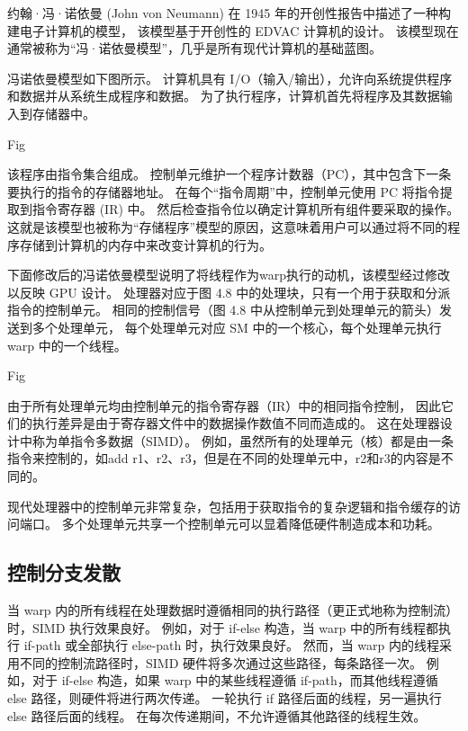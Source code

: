 \begin{remark}[warp与SIMD硬件]
约翰·冯·诺依曼 (John von Neumann) 在 1945 年的开创性报告中描述了一种构建电子计算机的模型，
该模型基于开创性的 EDVAC 计算机的设计。 该模型现在通常被称为“冯·诺依曼模型”，几乎是所有现代计算机的基础蓝图。

冯诺依曼模型如下图所示。 计算机具有 I/O（输入/输出），允许向系统提供程序和数据并从系统生成程序和数据。 
为了执行程序，计算机首先将程序及其数据输入到存储器中。

{\color{red} Fig}

该程序由指令集合组成。 控制单元维护一个程序计数器（PC），其中包含下一条要执行的指令的存储器地址。 
在每个“指令周期”中，控制单元使用 PC 将指令提取到指令寄存器 (IR) 中。 然后检查指令位以确定计算机所有组件要采取的操作。 
这就是该模型也被称为“存储程序”模型的原因，这意味着用户可以通过将不同的程序存储到计算机的内存中来改变计算机的行为。

下面修改后的冯诺依曼模型说明了将线程作为warp执行的动机，该模型经过修改以反映 GPU 设计。 
处理器对应于图 4.8 中的处理块，只有一个用于获取和分派指令的控制单元。 
相同的控制信号（图 4.8 中从控制单元到处理单元的箭头）发送到多个处理单元，
每个处理单元对应 SM 中的一个核心，每个处理单元执行 warp 中的一个线程。

{\color{red} Fig}

由于所有处理单元均由控制单元的指令寄存器（IR）中的相同指令控制，
因此它们的执行差异是由于寄存器文件中的数据操作数值不同而造成的。 这在处理器设计中称为单指令多数据（SIMD）。 
例如，虽然所有的处理单元（核）都是由一条指令来控制的，如add r1、r2、r3，但是在不同的处理单元中，r2和r3的内容是不同的。

现代处理器中的控制单元非常复杂，包括用于获取指令的复杂逻辑和指令缓存的访问端口。 
多个处理单元共享一个控制单元可以显着降低硬件制造成本和功耗。
\end{remark}

\subsection{控制分支发散}
当 warp 内的所有线程在处理数据时遵循相同的执行路径（更正式地称为控制流）时，SIMD 执行效果良好。 
例如，对于 if-else 构造，当 warp 中的所有线程都执行 if-path 或全部执行 else-path 时，执行效果良好。 
然而，当 warp 内的线程采用不同的控制流路径时，SIMD 硬件将多次通过这些路径，每条路径一次。 
例如，对于 if-else 构造，如果 warp 中的某些线程遵循 if-path，而其他线程遵循 else 路径，则硬件将进行两次传递。 
一轮执行 if 路径后面的线程，另一遍执行 else 路径后面的线程。 在每次传递期间，不允许遵循其他路径的线程生效。

